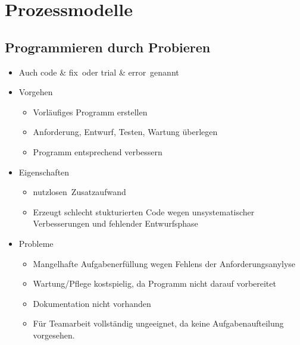 \section{Prozessmodelle}

\subsection{Programmieren durch Probieren}
\begin{itemize}
    \item Auch \glqq code \& fix\grqq\ oder \glqq trial \& error\grqq\  genannt
    \item Vorgehen
    \begin{itemize}
        \item Vorläufiges Programm erstellen
        \item Anforderung, Entwurf, Testen, Wartung überlegen
        \item Programm entsprechend \glqq verbessern\grqq
    \end{itemize}
    \item Eigenschaften
    \begin{itemize}
        \item \glqq nutzlosen\grqq\ Zusatzaufwand
        \item Erzeugt schlecht stukturierten Code wegen unsystematischer Verbesserungen und fehlender Entwurfsphase
    \end{itemize}
    \item Probleme
    \begin{itemize}
        \item Mangelhafte Aufgabenerfüllung wegen Fehlens der Anforderungsanylyse
        \item Wartung/Pflege kostspielig, da Programm nicht darauf vorbereitet
        \item Dokumentation nicht vorhanden
        \item Für Teamarbeit vollständig ungeeignet, da keine Aufgabenaufteilung vorgesehen.
    \end{itemize}
\end{itemize}

